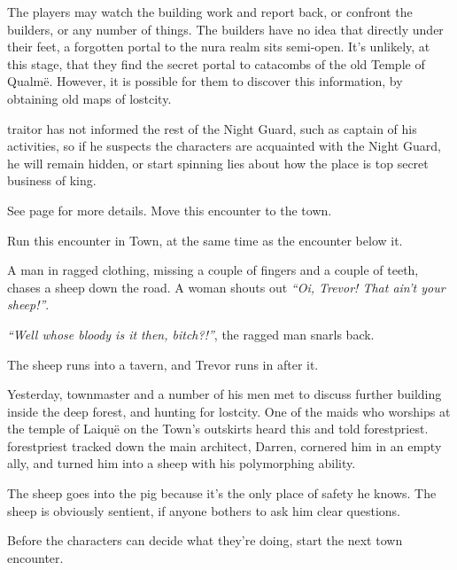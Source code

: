 \begin{multicols}{2}
The players may watch the building work and report back, or confront the builders, or any number of things.
The builders have no idea that directly under their feet, a forgotten portal to the nura realm sits semi-open.
It's unlikely, at this stage, that they find the secret portal to catacombs of the old Temple of Qualm\"{e}.
However, it is possible for them to discover this information, by obtaining old maps of \gls{lostcity}.

\Gls{traitor} has not informed the rest of the Night Guard, such as \gls{captain} of his activities, so if he suspects the characters are acquainted with the Night Guard, he will remain hidden, or start spinning lies about how the place is top secret business of \gls{king}.


See page \pageref{green_tower} for more details.  Move this encounter to the town.


Run this encounter in Town, at the same time as the encounter below it.

\begin{boxtext}

	A man in ragged clothing, missing a couple of fingers and a couple of teeth, chases a sheep down the road.  A woman shouts out \emph{``Oi, Trevor! That ain't your sheep!''}.

	\emph{``Well whose bloody is it then, bitch?!''}, the ragged man snarls back.

	The sheep runs into a tavern, and Trevor runs in after it.

\end{boxtext}

Yesterday, \gls{townmaster} and a number of his men met to discuss further building inside the deep forest, and hunting for \gls{lostcity}.
One of the maids who worships at the temple of Laiqu\"{e} on the Town's outskirts heard this and told \gls{forestpriest}.
\Gls{forestpriest} tracked down the main architect, Darren, cornered him in an empty ally, and turned him into a sheep with his polymorphing ability.

The sheep goes into the \gls{pig} because it's the only place of safety he knows.  The sheep is obviously sentient, if anyone bothers to ask him clear questions.

Before the characters can decide what they're doing, start the next town encounter.



\end{multicols}
